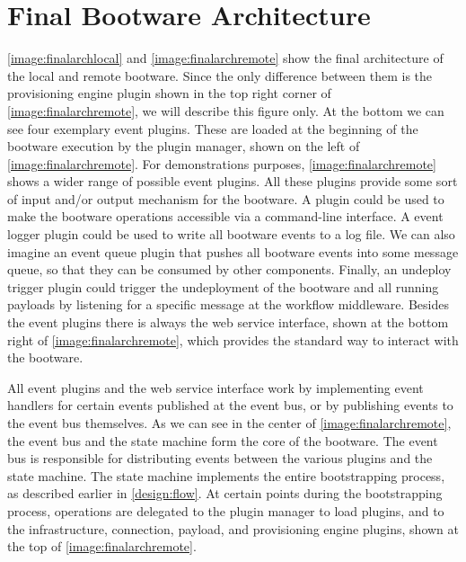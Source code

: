 \section{Final Bootware Architecture}
\label{design:finalarch}

\autoref{image:finalarchlocal} and \autoref{image:finalarchremote} show the final architecture of the local and remote bootware.
Since the only difference between them is the provisioning engine plugin shown in the top right corner of \autoref{image:finalarchremote}, we will describe this figure only.
At the bottom we can see four exemplary event plugins.
These are loaded at the beginning of the bootware execution by the plugin manager, shown on the left of \autoref{image:finalarchremote}.
For demonstrations purposes, \autoref{image:finalarchremote} shows a wider range of possible event plugins.
All these plugins provide some sort of input and/or output mechanism for the bootware.
A  plugin could be used to make the bootware operations accessible via a command-line interface.
A event logger plugin could be used to write all bootware events to a log file.
We can also imagine an event queue plugin that pushes all bootware events into some message queue, so that they can be consumed by other components.
Finally, an undeploy trigger plugin could trigger the undeployment of the bootware and all running payloads by listening for a specific message at the workflow middleware.
Besides the event plugins there is always the web service interface, shown at the bottom right of \autoref{image:finalarchremote}, which provides the standard way to interact with the bootware.

All event plugins and the web service interface work by implementing event handlers for certain events published at the event bus, or by publishing events to the event bus themselves.
As we can see in the center of \autoref{image:finalarchremote}, the event bus and the state machine form the core of the bootware.
The event bus is responsible for distributing events between the various plugins and the state machine.
The state machine implements the entire bootstrapping process, as described earlier in \autoref{design:flow}.
At certain points during the bootstrapping process, operations are delegated to the plugin manager to load plugins, and to the infrastructure, connection, payload, and provisioning engine plugins, shown at the top of \autoref{image:finalarchremote}.

